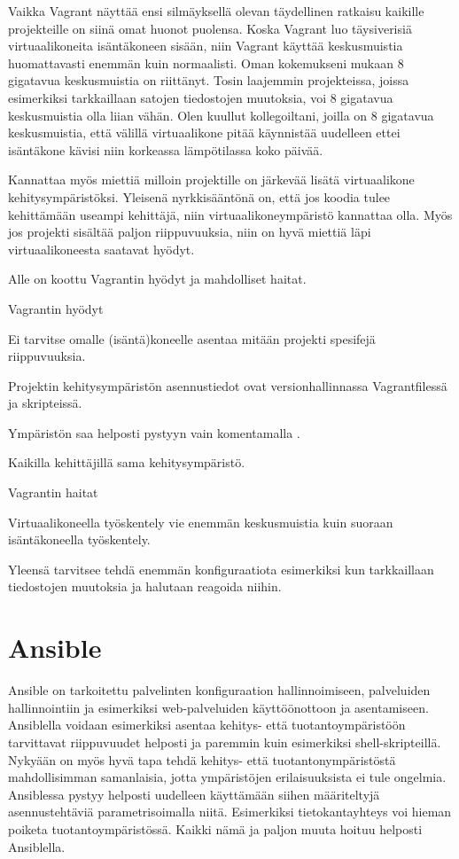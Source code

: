 Vaikka Vagrant näyttää ensi silmäyksellä olevan täydellinen ratkaisu kaikille projekteille on siinä omat huonot puolensa. Koska Vagrant luo täysiverisiä virtuaalikoneita isäntäkoneen sisään, niin Vagrant käyttää keskusmuistia huomattavasti enemmän kuin normaalisti. Oman kokemukseni mukaan 8 gigatavua keskusmuistia on riittänyt. Tosin laajemmin projekteissa, joissa esimerkiksi tarkkaillaan satojen tiedostojen muutoksia, voi 8 gigatavua keskusmuistia olla liian vähän. Olen kuullut kollegoiltani, joilla on 8 gigatavua keskusmuistia, että välillä virtuaalikone pitää käynnistää uudelleen ettei isäntäkone kävisi niin korkeassa lämpötilassa koko päivää.

Kannattaa myös miettiä milloin projektille on järkevää lisätä virtuaalikone kehitysympäristöksi. Yleisenä nyrkkisääntönä on, että jos koodia tulee kehittämään useampi kehittäjä, niin virtuaalikoneympäristö kannattaa olla. Myös jos projekti sisältää paljon riippuvuuksia, niin on hyvä miettiä läpi virtuaalikoneesta saatavat hyödyt.

Alle on koottu Vagrantin hyödyt ja mahdolliset haitat.

Vagrantin hyödyt
\begin{bullet-list}
  \item Ei tarvitse omalle (isäntä)koneelle asentaa mitään projekti spesifejä riippuvuuksia.
  \item Projektin kehitysympäristön asennustiedot ovat versionhallinnassa Vagrantfilessä ja skripteissä.
  \item Ympäristön saa helposti pystyyn vain komentamalla .
  \item Kaikilla kehittäjillä sama kehitysympäristö.
\end{bullet-list}

Vagrantin haitat
\begin{bullet-list}
  \item Virtuaalikoneella työskentely vie enemmän keskusmuistia kuin suoraan isäntäkoneella työskentely.
  \item Yleensä tarvitsee tehdä enemmän konfiguraatiota esimerkiksi kun tarkkaillaan tiedostojen muutoksia ja halutaan reagoida niihin.
\end{bullet-list}

\section{Ansible}

Ansible on tarkoitettu palvelinten konfiguraation hallinnoimiseen, palveluiden hallinnointiin ja esimerkiksi web-palveluiden käyttöönottoon ja asentamiseen. Ansiblella voidaan esimerkiksi asentaa kehitys- että tuotantoympäristöön tarvittavat riippuvuudet helposti ja paremmin kuin esimerkiksi shell-skripteillä. Nykyään on myös hyvä tapa tehdä kehitys- että tuotantonympäristöstä mahdollisimman samanlaisia, jotta ympäristöjen erilaisuuksista ei tule ongelmia. Ansiblessa pystyy helposti uudelleen käyttämään siihen määriteltyjä asennustehtäviä parametrisoimalla niitä. Esimerkiksi tietokantayhteys voi hieman poiketa tuotantoympäristössä. Kaikki nämä ja paljon muuta hoituu helposti Ansiblella.

